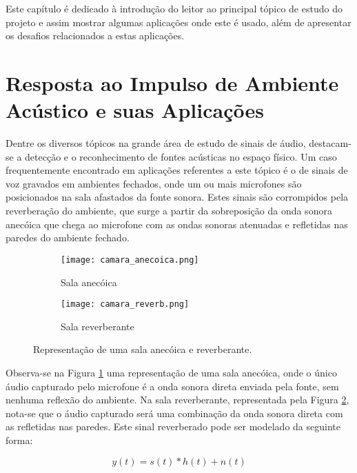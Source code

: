 Este capítulo é dedicado à introdução do leitor ao principal tópico de estudo do projeto e assim mostrar
algumas aplicações onde este é usado, além de apresentar os desafios relacionados a estas aplicações.

\section{Resposta ao Impulso de Ambiente Acústico e suas Aplicações}

Dentre os diversos tópicos na grande área de estudo de sinais de áudio, destacam-se a detecção e o reconhecimento de fontes acústicas no espaço físico.
Um caso frequentemente encontrado em aplicações referentes a este tópico é o de sinais de voz gravados em ambientes fechados,
onde um ou mais microfones são posicionados na sala afastados da fonte sonora.
Estes sinais são corrompidos pela reverberação do ambiente, que surge a partir da sobreposição da onda sonora anecóica que chega ao microfone com as 
ondas sonoras atenuadas e refletidas nas paredes do ambiente fechado. 

\begin{figure} [H]
    \begin{subfigure}{.5\textwidth}
        \centering
        \texttt{[image: camara\_anecoica.png]}
        \caption{Sala anecóica}
        \label{fig:Rooms_a}    
    \end{subfigure}
    \begin{subfigure}{.5\textwidth}
        \centering
        \texttt{[image: camara\_reverb.png]}
        \caption{Sala reverberante}
        \label{fig:Rooms_b}    
    \end{subfigure}
    \caption{Representação de uma sala anecóica e reverberante.}
    \label{fig:Rooms}
\end{figure}

Observa-se na Figura \ref{fig:Rooms_a} uma representação de uma sala anecóica, onde o único áudio capturado pelo microfone é a onda sonora direta
enviada pela fonte, sem nenhuma reflexão do ambiente. Na sala reverberante, representada pela Figura \ref{fig:Rooms_b},
nota-se que o áudio capturado será uma combinação da onda sonora direta com as refletidas nas paredes. 
Este sinal reverberado pode ser modelado da seguinte forma:

\begin{equation} \label{eqn:model}
    y(t) = s(t) \ast h(t) + n(t)
\end{equation}

